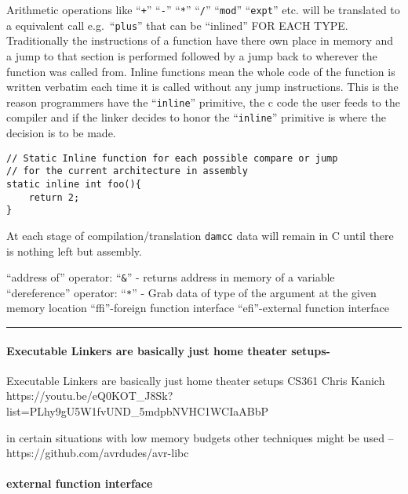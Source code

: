Arithmetic operations like ``\texttt{+}'' ``\texttt{-}'' ``\texttt{*}''
``\texttt{/}'' ``\texttt{mod}'' ``\texttt{expt}'' etc. will be
translated to a equivalent call e.g.~``\texttt{plus}'' that can be
``inlined'' FOR EACH TYPE. Traditionally the instructions of a function
have there own place in memory and a jump to that section is performed
followed by a jump back to wherever the function was called from. Inline
functions mean the whole code of the function is written verbatim each
time it is called without any jump instructions. This is the reason
programmers have the ``\texttt{inline}'' primitive, the c code the user
feeds to the compiler and if the linker decides to honor the
``\texttt{inline}'' primitive is where the decision is to be made.

\begin{verbatim}
// Static Inline function for each possible compare or jump
// for the current architecture in assembly
static inline int foo(){
    return 2;
}
\end{verbatim}

At each stage of compilation/translation \texttt{damcc} data will remain
in C until there is nothing left but assembly.

``address of'' operator: ``\texttt{\&}'' - returns address in memory of
a variable ``dereference'' operator: ``\texttt{*}'' - Grab data of type
of the argument at the given memory location ``ffi''-foreign function
interface ``efi''-external function interface

\begin{center}\rule{0.5\linewidth}{0.5pt}\end{center}

\hypertarget{executable-linkers-are-basically-just-home-theater-setups-}{%
\paragraph{Executable Linkers are basically just home theater
setups-}\label{executable-linkers-are-basically-just-home-theater-setups-}}

Executable Linkers are basically just home theater setups CS361 Chris
Kanich
https://youtu.be/eQ0KOT\_J8Sk?list=PLhy9gU5W1fvUND\_5mdpbNVHC1WCIaABbP

in certain situations with low memory budgets other techniques might be
used --https://github.com/avrdudes/avr-libc

\hypertarget{external-function-interface}{%
\paragraph{external function
interface}\label{external-function-interface}}

